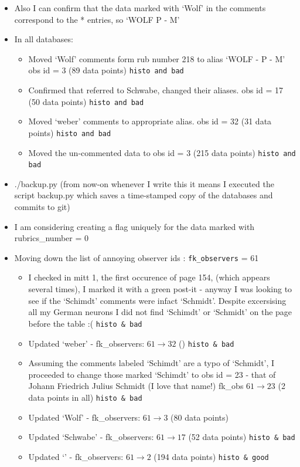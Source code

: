 \documentclass[12pt]{article}
\begin{document}
\begin{itemize}
    \item Also I can confirm that the data marked with `Wolf' in the comments correspond to the * entries, so `WOLF P - M'
    \item In all databases:
    \begin{itemize}
        \item Moved `Wolf' comments form rub number 218 to alias `WOLF - P - M' obs id = 3 (89 data points) \texttt{histo and bad}
        \item Confirmed that \dag{} referred to Schwabe, changed their aliases. obs id = 17 (50 data points) \texttt{histo and bad}
        \item Moved `weber' comments to appropriate alias. obs id = 32 (31 data points) \texttt{histo and bad}
        \item Moved the un-commented data to obs id = 3 (215 data points) \texttt{histo and bad}
    \end{itemize}
    \item ./backup.py (from now-on whenever I write this it means I executed the script backup.py which saves a time-stamped copy of the databases and commits to git)
    \item I am considering creating a flag uniquely for the data marked with rubrics\_number = 0
    \item Moving down the list of annoying observer ids : \texttt{fk\_observers} = 61
    \begin{itemize}
        \item I checked in mitt 1, the first occurence of page 154, (which appears several times), I marked it with a green post-it - anyway I was looking to see if the `Schimdt' comments were infact `Schmidt'. Despite excersising all my German neurons I did not find `Schimdt' or `Schmidt' on the page before the table :( \texttt{histo \& bad}
        \item Updated `weber' - fk\_observers: $61\to 32$ () \texttt{histo \& bad}
        \item Assuming the comments labeled `Schimdt' are a typo of `Schmidt', I proceeded to change those marked `Schimdt' to obs id = 23 - that of Johann Friedrich  Julius Schmidt (I love that name!) fk\_obs $61\to 23$ (2 data points in all) \texttt{histo & bad}
        \item Updated `Wolf' - fk\_observers: $61\to 3$ (80 data points) 
        \item Updated `Schwabe' - fk\_observers: $61\to 17$ (52 data points) \texttt{histo \& bad}
        \item Updated `' -  fk\_observers: $61\to 2$ (194 data points) \texttt{histo \& good}

\end{itemize}
\end{itemize}
\end{document}
